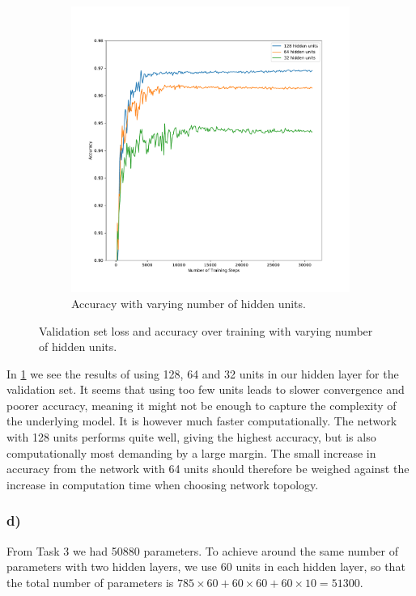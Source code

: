 \begin{figure}[h!]
\begin{subfigure}[b]{0.49\textwidth}
    \includegraphics[clip,trim=1cm 0cm 1cm 0cm, width=\textwidth]{figures/Task4ab_accuracy.pdf}
    \caption{Accuracy with varying number of hidden units.}
  \end{subfigure}
  \caption{Validation set loss and accuracy over training with varying number of hidden units.}
  \label{fig:task4:ab}
\end{figure}

In \cref{fig:task4:ab} we see the results of using 128, 64 and 32 units in our hidden layer for the validation set. It seems that using too few units leads to slower convergence and poorer accuracy, meaning it might not be enough to capture the complexity of the underlying model. It is however much faster computationally. The network with 128 units performs quite well, giving the highest accuracy, but is also computationally most demanding by a large margin. The small increase in accuracy from the network with 64 units should therefore be weighed against the increase in computation time when choosing network topology.


\subsubsection*{d)}

From Task 3 we had 50880 parameters. To achieve around the same number of parameters with two hidden layers, we use 60 units in each hidden layer, so that the total number of parameters is $785 \times 60 + 60 \times 60 + 60 \times 10 = 51300$.

